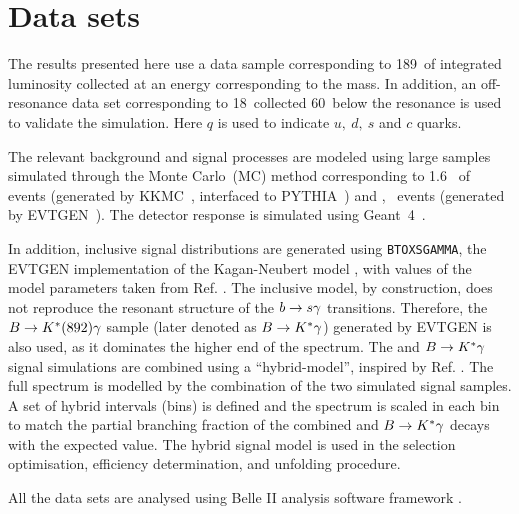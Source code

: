 \section{Data sets}\label{sec:datasets}


The results presented here use a data sample corresponding to 189~\invfb of integrated luminosity collected at an energy corresponding to the \FourS mass. In addition, an off-resonance data set corresponding to 18~\invfb collected 60~\mev below the \FourS resonance is used to validate the \epem\ra\qqbar simulation. Here $q$ is used to indicate $u,~d,~s$ and $c$ quarks.

The relevant background and signal processes are modeled using large samples simulated through the Monte Carlo~(MC) method corresponding to \mbox{1.6 \invab} of \epem\ra\qqbar events (generated by KKMC~\cite{Ward:2002qq}, interfaced to PYTHIA~\cite{Sjostrand:2007gs}) and  \mbox{\FourS\ra\BzBzb, \BpBm} events (generated by EVTGEN~\cite{Ryd:2005zz}). The detector response is simulated using Geant~4~\cite{Agostinelli:2002hh}.

In addition, inclusive \BtoXsgamma signal distributions are generated using \texttt{BTOXSGAMMA}, the EVTGEN implementation of the Kagan-Neubert model \cite{Kagan:1998ym}, with values of the model parameters taken from Ref. \cite{simba}. The inclusive model, by construction, does not reproduce the resonant structure of the $b\rightarrow s\gamma$ transitions. Therefore, the $B\rightarrow K^*(892)\gamma$ sample (later denoted as $B\rightarrow K^*\gamma$) generated by EVTGEN is also used, as it dominates the higher end of the \Egamma spectrum. The \BtoXsgamma and $B\rightarrow K^*\gamma$  signal simulations are combined using a ``hybrid-model'', inspired by Ref. \cite{hybrid_model}. The full spectrum is modelled by the combination of the two simulated signal samples. A set of hybrid \EB intervals (bins) is defined and the \BtoXsgamma spectrum is scaled in each bin to match the partial branching fraction of the combined \BtoXsgamma and $B\rightarrow K^*\gamma$ decays with the expected value. The hybrid signal model is used in the selection optimisation, efficiency determination, and unfolding procedure.


All the data sets are analysed using Belle II analysis software framework \cite{Kuhr:2018lps}.
